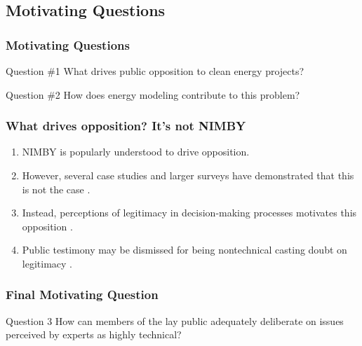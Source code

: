 \subsection{Motivating Questions}
\begin{frame}
    \frametitle{Motivating Questions}

        \begin{block}{Question \#1}
            What drives public opposition to clean energy projects?
        \end{block}
        \begin{block}{Question \#2}
            How does energy modeling contribute to this problem? 
        \end{block}
\end{frame}


\begin{frame}
    \frametitle{What drives opposition? It's not NIMBY}

    \begin{enumerate}
        \item NIMBY is popularly understood to drive opposition.
        \item However, several case studies and larger surveys have demonstrated
        that this is not the case \cite{konisky_proximity_2021,aitken_why_2010}.
        \item Instead, perceptions of legitimacy in decision-making processes
        motivates this opposition
        \cite{firestone_public_2012-1,stokes_prevalence_2023,
        aitken_why_2010,walker_procedural_2017,liu_effects_2020}.
        \item Public testimony may be dismissed for being nontechnical casting
        doubt on legitimacy \cite{johnson_dakota_2021}.
    \end{enumerate}

\end{frame}

\begin{frame}
    \frametitle{Final Motivating Question}

    \begin{block}{Question 3}
        How can members of the lay public adequately deliberate on issues
        perceived by experts as highly technical?
    \end{block}

\end{frame}


